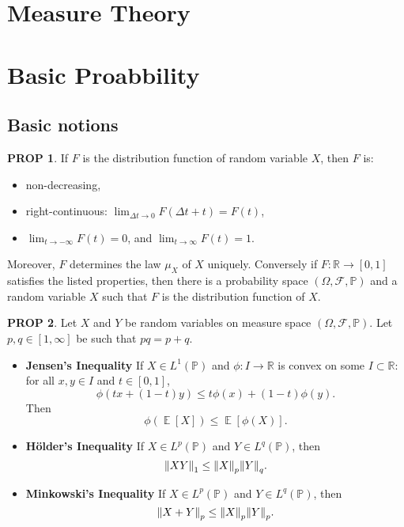 \documentclass[hidelinks,11pt]{article}
\theoremstyle{definition}
\theoremstyle{dotless}
\newtheorem{prop}{PROP}[section]
\theoremstyle{remark}
\DeclareMathOperator{\E}{\mathbb{E}}
\begin{document}
\section{Measure Theory}

\section{Basic Proabbility}

\subsection{Basic notions}

\begin{prop}\label{Prop 2.1}
If $F$ is the distribution function of random variable $X$, then $F$ is:\begin{itemize}
    \item non-decreasing,
    \item right-continuous: $\lim_{\Delta t\to0}F(\Delta t+t)=F(t)$,
    \item $\lim_{t\to-\infty}F(t)=0$, and $\lim_{t\to\infty}F(t)=1$.
\end{itemize}
Moreover, $F$ determines the law $\mu_X$ of $X$ uniquely. Conversely if $F:\mathbb{R}\to[0,1]$ satisfies the listed properties, then there is a probability space $(\Omega, \mathcal{F},\mathbb{P})$ and a random variable $X$ such that $F$ is the distribution function of $X$.
\end{prop}

\begin{prop}\label{Prop 2.2}
Let $X$ and $Y$ be random variables on measure space $(\Omega,\mathcal{F},\mathbb{P})$. Let $p,q\in[1,\infty]$ be such that $pq=p+q$.
\begin{itemize}
    \item \textup{\textbf{Jensen's Inequality}} If $X\in L^1(\mathbb{P})$ and $\phi:I\to\mathbb{R}$ is convex on some $I\subset\mathbb{R}$: for all $x,y\in I$ and $t\in[0,1]$,
    \[\phi(tx+(1-t)y)\leq t\phi(x)+(1-t)\phi(y).\]
    Then
    \[\phi(\E[X])\leq\E[\phi(X)].\]
    \item \textup{\textbf{Hölder's Inequality}} If $X\in L^p(\mathbb{P})$ and $Y\in L^q(\mathbb{P})$, then
    \[\norm{XY}_1\leq\norm{X}_p\norm{Y}_q.\]
    \item \textup{\textbf{Minkowski's Inequality}} If $X\in L^p(\mathbb{P})$ and $Y\in L^q(\mathbb{P})$, then
    \[\norm{X+Y}_{p}\leq\norm{X}_p\norm{Y}_p.\]
\end{itemize}
\end{prop}
\end{document}

